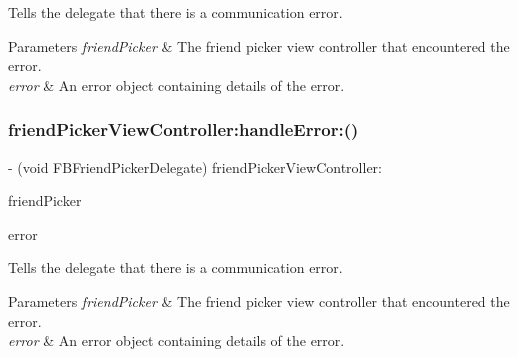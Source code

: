 Tells the delegate that there is a communication error.


\begin{DoxyParams}{Parameters}
{\em friend\+Picker} & The friend picker view controller that encountered the error. \\
\hline
{\em error} & An error object containing details of the error. \\
\hline
\end{DoxyParams}
\mbox{\label{protocolFBFriendPickerDelegate_01-p_ac4b023444722c5b44144284f593c8f67}} 
\subsubsection{\texorpdfstring{friend\+Picker\+View\+Controller\+:handle\+Error\+:()}{friendPickerViewController:handleError:()}\hspace{0.1cm}{\footnotesize\ttfamily [3/5]}}
{\footnotesize\ttfamily -\/ (void F\+B\+Friend\+Picker\+Delegate) friend\+Picker\+View\+Controller\+: \begin{DoxyParamCaption}\item[{(\hyperlink{interfaceFBFriendPickerViewController}{F\+B\+Friend\+Picker\+View\+Controller} $\ast$)}]{friend\+Picker }\item[{handleError:(N\+S\+Error $\ast$)}]{error }\end{DoxyParamCaption}\hspace{0.3cm}{\ttfamily [optional]}}

Tells the delegate that there is a communication error.


\begin{DoxyParams}{Parameters}
{\em friend\+Picker} & The friend picker view controller that encountered the error. \\
\hline
{\em error} & An error object containing details of the error. \\
\hline
\end{DoxyParams}
\mbox{\label{protocolFBFriendPickerDelegate_01-p_ac4b023444722c5b44144284f593c8f67}} 
